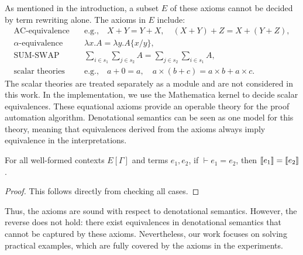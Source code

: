 \documentclass[runningheads]{llncs}
\begin{document}
As mentioned in the introduction, a subset \( E \) of these axioms cannot be decided by term rewriting alone. The axioms in \( E \) include:
\[
\begin{aligned}
    \text{AC-equivalence} &\quad \text{e.g.,} \quad X + Y = Y + X, \quad (X + Y) + Z = X + (Y + Z), \\
    \alpha\text{-equivalence} &\quad \lambda x . A = \lambda y . A\{x/y\}, \\
    \text{SUM-SWAP} &\quad \sum_{i \in s_1} \sum_{j \in s_2} A = \sum_{j \in s_2} \sum_{i \in s_1} A, \\
    \text{scalar theories} &\quad \text{e.g.,} \quad a + 0 = a, \quad a \times (b + c) = a \times b + a \times c.
\end{aligned}
\]
The scalar theories are treated separately as a module and are not considered in this work. In the implementation, we use the Mathematica kernel to decide scalar equivalences.
These equational axioms provide an operable theory for the proof automation algorithm. Denotational semantics can be seen as one model for this theory, meaning that equivalences derived from the axioms always imply equivalence in the interpretations.
\begin{lemma}
    For all well-formed contexts \( E[\Gamma] \) and terms \( e_1, e_2 \), if \( \vdash e_1 = e_2 \), then \( {\llbracket e_1 \rrbracket} = {\llbracket e_2 \rrbracket} \).
\end{lemma}
\begin{proof}
    This follows directly from checking all cases.
\end{proof}

Thus, the axioms are sound with respect to denotational semantics. However, the reverse does not hold: there exist equivalences in denotational semantics that cannot be captured by these axioms. Nevertheless, our work focuses on solving practical examples, which are fully covered by the axioms in the experiments.
\end{document}
